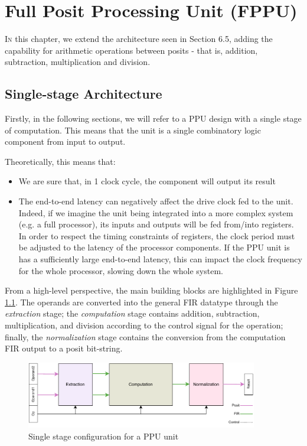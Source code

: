 \chapter{Full Posit Processing Unit (FPPU)}\label{chap:posit_fullppu}

\lettrine{I}{n} this chapter, we extend the architecture seen in Section 6.5, adding the capability for arithmetic operations between posits - that is, addition, subtraction, multiplication and division.



\section{Single-stage Architecture}

Firstly, in the following sections, we will refer to a PPU design with a single stage of computation. This means that the unit is a single combinatory logic component from input to output.

Theoretically, this means that:
\begin{itemize}
    \item We are sure that, in 1 clock cycle, the component will output its result
    \item The end-to-end latency can negatively affect the drive clock fed to the unit. Indeed, if we imagine the unit being integrated into a more complex system (e.g. a full processor), its inputs and outputs will be fed from/into registers. In order to respect the timing constraints of registers, the clock period must be adjusted to the latency of the processor components. If the PPU unit is has a sufficiently large end-to-end latency, this can impact the clock frequency for the whole processor, slowing down the whole system.
\end{itemize}

From a high-level perspective, the main building blocks are highlighted in Figure \ref{fig:overview_ppu}.
The operands are converted into the general FIR datatype through the \textit{extraction} stage; the \textit{computation} stage contains addition, subtraction, multiplication, and division according to the control signal for the operation; finally, the \textit{normalization} stage contains the conversion from the computation FIR output to a posit bit-string.

\begin{figure}
    \begin{center}
    \includegraphics[width=0.9\textwidth]{figures/top.pdf}
    \caption{Single stage configuration for a PPU unit}
    \label{fig:overview_ppu}
    \end{center}
\end{figure}

